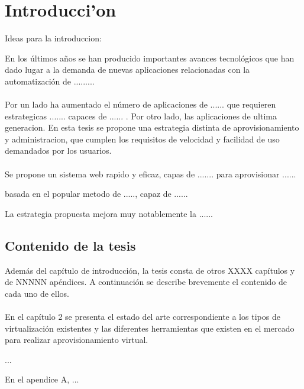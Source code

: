\chapter{Introducci'on}

Ideas para la introduccion:

En los últimos años se han producido importantes avances tecnológicos que han dado lugar a la demanda de nuevas aplicaciones relacionadas con la automatización de .........\\
\\
Por un lado ha aumentado el número de aplicaciones de ...... que requieren estrategicas ....... capaces de ...... . Por otro lado, las aplicaciones  de ultima generacion. En esta tesis se propone una estrategia distinta de aprovisionamiento y administracion, que cumplen los requisitos de velocidad y facilidad de uso demandados por los usuarios.\\
\\
Se propone un sistema web rapido y eficaz, capas de ....... para aprovisionar ...... 

basada en el popular metodo de ....., capaz de ......

La estrategia propuesta mejora muy notablemente la ......

\section{Contenido de la tesis}
Además del capítulo de introducción, la tesis consta de otros XXXX capítulos y de NNNNN apéndices. A continuación se describe brevemente el contenido de cada uno de ellos.\\
\\
En el capítulo 2 se presenta el estado del arte correspondiente a los tipos de virtualización existentes y las diferentes herramientas que existen en el mercado para realizar aprovisionamiento virtual.

...

En el apendice A, ...
